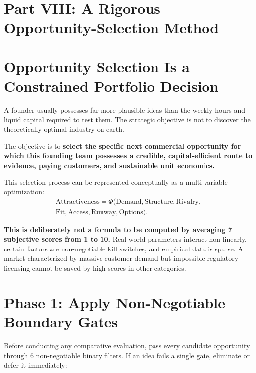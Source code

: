 \section*{Part VIII: A Rigorous Opportunity-Selection Method}

\section{Opportunity Selection Is a Constrained Portfolio Decision}

A founder usually possesses far more plausible ideas than the weekly hours and liquid capital required to test them. The strategic objective is not to discover the theoretically optimal industry on earth.

The objective is to \textbf{select the specific next commercial opportunity for which this founding team possesses a credible, capital-efficient route to evidence, paying customers, and sustainable unit economics.}

This selection process can be represented conceptually as a multi-variable optimization:
\begin{multline}
\label{eq:opportunity_selection}
\text{Attractiveness} = \Phi\bigl(\text{Demand}, \text{Structure}, \text{Rivalry}, \\
\text{Fit}, \text{Access}, \text{Runway}, \text{Options}\bigr).
\end{multline}

\textbf{This is deliberately not a formula to be computed by averaging 7 subjective scores from 1 to 10.} Real-world parameters interact non-linearly, certain factors are non-negotiable kill switches, and empirical data is sparse. A market characterized by massive customer demand but impossible regulatory licensing cannot be saved by high scores in other categories.

\section{Phase 1: Apply Non-Negotiable Boundary Gates}

Before conducting any comparative evaluation, pass every candidate opportunity through 6 non-negotiable binary filters. If an idea fails a single gate, eliminate or defer it immediately:

